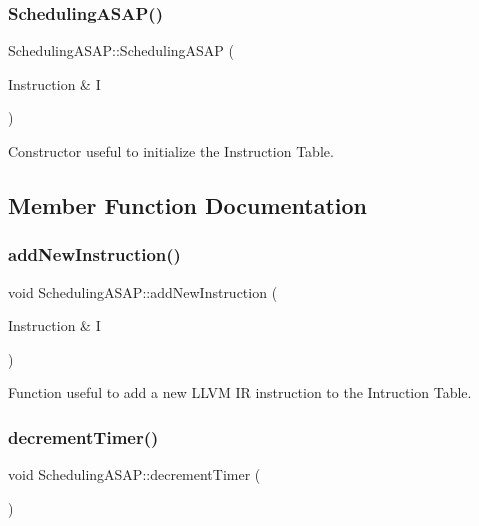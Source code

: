 \subsubsection{\texorpdfstring{Scheduling\+A\+S\+A\+P()}{SchedulingASAP()}\hspace{0.1cm}{\footnotesize\ttfamily [2/2]}}
{\footnotesize\ttfamily Scheduling\+A\+S\+A\+P\+::\+Scheduling\+A\+S\+AP (\begin{DoxyParamCaption}\item[{Instruction \&}]{I }\end{DoxyParamCaption})}



Constructor useful to initialize the Instruction Table. 



\subsection{Member Function Documentation}
\mbox{\label{classoctantis_1_1SchedulingASAP_ae901ec5f1113be04c9c28ab0f796c166}} 
\subsubsection{\texorpdfstring{add\+New\+Instruction()}{addNewInstruction()}}
{\footnotesize\ttfamily void Scheduling\+A\+S\+A\+P\+::add\+New\+Instruction (\begin{DoxyParamCaption}\item[{Instruction \&}]{I }\end{DoxyParamCaption})}



Function useful to add a new L\+L\+VM IR instruction to the Intruction Table. 

\mbox{\label{classoctantis_1_1SchedulingASAP_a32cbd30ee5e9591898edf498c03ddfaf}} 
\subsubsection{\texorpdfstring{decrement\+Timer()}{decrementTimer()}}
{\footnotesize\ttfamily void Scheduling\+A\+S\+A\+P\+::decrement\+Timer (\begin{DoxyParamCaption}{ }\end{DoxyParamCaption})}



